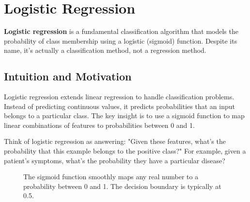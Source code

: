 
\section{Logistic Regression }
\label{sec:logistic-regression}

\textbf{Logistic regression} is a fundamental classification algorithm that models the probability of class membership using a logistic (sigmoid) function. Despite its name, it's actually a classification method, not a regression method.

\subsection{Intuition and Motivation}

Logistic regression extends linear regression to handle classification problems. Instead of predicting continuous values, it predicts probabilities that an input belongs to a particular class. The key insight is to use a sigmoid function to map linear combinations of features to probabilities between 0 and 1.

Think of logistic regression as answering: "Given these features, what's the probability that this example belongs to the positive class?" For example, given a patient's symptoms, what's the probability they have a particular disease?

\begin{figure}[htbp]
\centering
{}
\caption{The sigmoid function smoothly maps any real number to a probability between 0 and 1. The decision boundary is typically at 0.5.}
\label{fig:sigmoid-function}
\end{figure}

